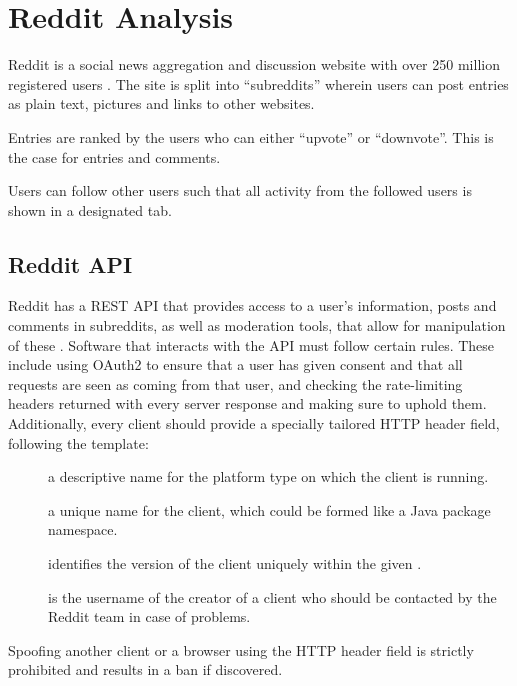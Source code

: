 \section{Reddit Analysis}\label{sec:reddit-analysis}
Reddit is a social news aggregation and discussion website with over 250 million
registered users \citep{AdvertiseOnReddit}. The site is split into
``subreddits'' wherein users can post entries as plain text, pictures and links to other websites. \nl

Entries are ranked by the users who can either ``upvote'' or ``downvote''. This
is the case for entries and comments. \citep{AboutReddit}\nl

Users can follow other users such that all activity from the followed users is
shown in a designated tab.

\subsection{Reddit API}\label{subsec:reddit-api}

Reddit has a \ac{REST} \ac{API} that provides access to a user's information,
posts and comments in subreddits, as well as moderation tools, that allow for
manipulation of these \citep{RedditApi}. Software that interacts with the
\ac{API} must follow certain rules. These include using OAuth2 to ensure that a
user has given consent and that all requests are seen as coming from that user,
and checking the rate-limiting headers returned with every server response and
making sure to uphold them.
Additionally, every client should provide a specially tailored 
\ac{HTTP} header field, following the template: \citep{RedditApiRules}\nl

\begin{center}
\end{center}\nl
\begin{description}
  \item[] a descriptive name for the platform type on which the client is running.
  \item[] a unique name for the client, which could be formed like a Java package namespace.
  \item[] identifies the version of the client uniquely
  within the given .
  \item[] is the username of the creator of a client who
  should be contacted by the Reddit team in case of problems.
\end{description}\nl

Spoofing another client or a browser using the  \ac{HTTP} header field is strictly prohibited and
results in a ban if discovered. \citep{RedditApiRules}\nl
